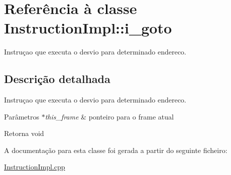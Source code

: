 \hypertarget{class_instruction_impl_1_1i__goto}{}\section{Referência à classe Instruction\+Impl\+:\+:i\+\_\+goto}
\label{class_instruction_impl_1_1i__goto}


Instruçao que executa o desvio para determinado endereco.  




\subsection{Descrição detalhada}
Instruçao que executa o desvio para determinado endereco. 


\begin{DoxyParams}{Parâmetros}
{\em $\ast$this\+\_\+frame} & ponteiro para o frame atual \\
\hline
\end{DoxyParams}
\begin{DoxyReturn}{Retorna}
void 
\end{DoxyReturn}


A documentação para esta classe foi gerada a partir do seguinte ficheiro\+:\begin{DoxyCompactItemize}
\item 
\hyperlink{_instruction_impl_8cpp}{Instruction\+Impl.\+cpp}\end{DoxyCompactItemize}
